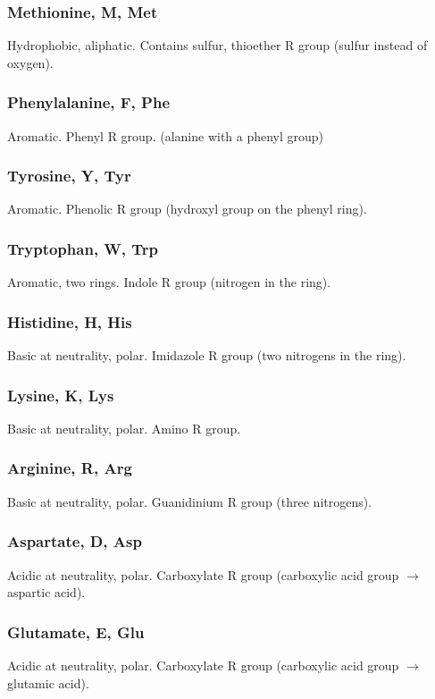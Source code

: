 \documentclass[letterpaper, 12pt]{article}
\begin{document}
\subsubsection*{Methionine, M, Met}
Hydrophobic, aliphatic. Contains sulfur, thioether R group (sulfur instead of oxygen).

\subsubsection*{Phenylalanine, F, Phe}
Aromatic. Phenyl R group. (alanine with a phenyl group)

\subsubsection*{Tyrosine, Y, Tyr}
Aromatic. Phenolic R group (hydroxyl group on the phenyl ring).

\subsubsection*{Tryptophan, W, Trp}
Aromatic, two rings. Indole R group (nitrogen in the ring).

\subsubsection*{Histidine, H, His}
Basic at neutrality, polar. Imidazole R group (two nitrogens in the ring).

\subsubsection*{Lysine, K, Lys}
Basic at neutrality, polar. Amino R group.

\subsubsection*{Arginine, R, Arg}
Basic at neutrality, polar. Guanidinium R group (three nitrogens).

\subsubsection*{Aspartate, D, Asp}
Acidic at neutrality, polar. Carboxylate R group (carboxylic acid group $\to$ aspartic acid).

\subsubsection*{Glutamate, E, Glu}
Acidic at neutrality, polar. Carboxylate R group (carboxylic acid group $\to$ glutamic acid).
\end{document}
